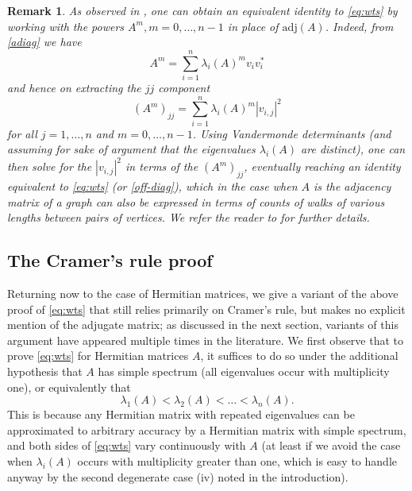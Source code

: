 \documentclass[12pt]{amsart}
\newtheorem{remark}[lemma]{Remark}
\begin{document}
\begin{remark}  As observed in \cite[Appendix A]{2014arXiv1401.4580V}, one can obtain an equivalent identity to \eqref{eq:wts} by working with the powers $A^m, m=0,\dots,n-1$ in place of $\mathrm{adj}(A)$.  Indeed, from \eqref{adiag} we have
$$ A^m = \sum_{i=1}^n \lambda_i(A)^m v_i v_i^*$$
and hence on extracting the $jj$ component
$$ (A^m)_{jj} = \sum_{i=1}^n \lambda_i(A)^m |v_{i,j}|^2$$
for all $j=1,\dots,n$ and $m=0,\dots,n-1$.  Using Vandermonde determinants (and assuming for sake of argument that the eigenvalues $\lambda_i(A)$ are distinct), one can then solve for the $|v_{i,j}|^2$ in terms of the $(A^m)_{jj}$, eventually reaching an identity \cite[Theorem 2]{2014arXiv1401.4580V} equivalent to \eqref{eq:wts} (or \eqref{off-diag}), which in the case when $A$ is the adjacency matrix of a graph can also be expressed in terms of counts of walks of various lengths between pairs of vertices. We refer the reader to \cite{2014arXiv1401.4580V} for further details.
\end{remark}

\subsection{The Cramer's rule proof}\label{cramer-sec}

Returning now to the case of Hermitian matrices, we give a variant of the above proof of \eqref{eq:wts} that still relies primarily on Cramer's rule, but makes no explicit mention of the adjugate matrix; as discussed in the next section, variants of this argument have appeared multiple times in the literature.  We first observe that to prove \eqref{eq:wts} for Hermitian matrices $A$, it suffices to do so under the additional hypothesis that $A$ has simple spectrum (all eigenvalues occur with multiplicity one), or equivalently that
$$ \lambda_1(A) < \lambda_2(A) < \dots < \lambda_n(A).$$
This is because any Hermitian matrix with repeated eigenvalues can be approximated to arbitrary accuracy by a Hermitian matrix with simple spectrum, and both sides of \eqref{eq:wts} vary continuously with $A$ (at least if we avoid the case when $\lambda_i(A)$ occurs with multiplicity greater than one, which is easy to handle anyway by the second degenerate case (iv) noted in the introduction).
\end{document}
